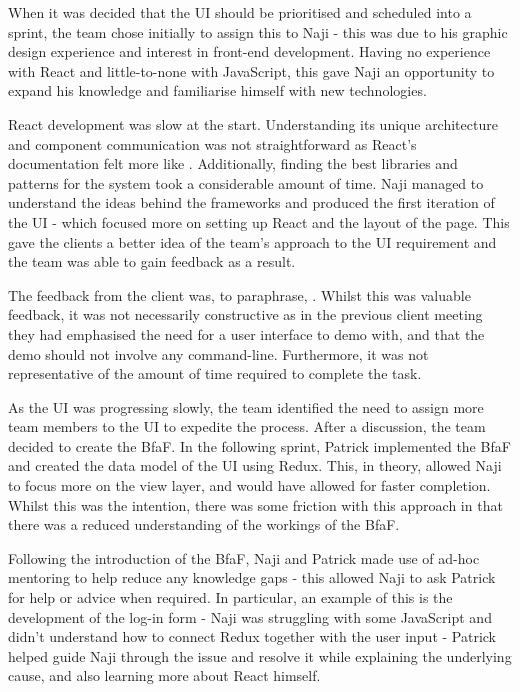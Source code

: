 \documentclass{l3proj}
\begin{document}
When it was decided that the UI should be prioritised and scheduled into a sprint, the team chose initially to assign this to Naji - this was due to his graphic design experience and interest in front-end development. Having no experience with React and little-to-none with JavaScript, this gave Naji an opportunity to expand his knowledge and familiarise himself with new technologies.

React development was slow at the start. Understanding its unique architecture and component communication was not straightforward as React's documentation felt more like . Additionally, finding the best libraries and patterns for the system took a considerable amount of time. Naji managed to understand the ideas behind the frameworks and produced the first iteration of the UI - which focused more on setting up React and the layout of the page. This gave the clients a better idea of the team's approach to the UI requirement and the team was able to gain feedback as a result.

The feedback from the client was, to paraphrase, . Whilst this was valuable feedback, it was not necessarily constructive as in the previous client meeting they had emphasised the need for a user interface to demo with, and that the demo should not involve any command-line. Furthermore, it was not representative of the amount of time required to complete the task.

As the UI was progressing slowly, the team identified the need to assign more team members to the UI to expedite the process. After a discussion, the team decided to create the BfaF. In the following sprint, Patrick implemented the BfaF and created the data model of the UI using Redux. This, in theory, allowed Naji to focus more on the view layer, and would have allowed for faster completion. Whilst this was the intention, there was some friction with this approach in that there was a reduced understanding of the workings of the BfaF.

Following the introduction of the BfaF, Naji and Patrick made use of ad-hoc mentoring to help reduce any knowledge gaps - this allowed Naji to ask Patrick for help or advice when required. In particular, an example of this is the development of the log-in form - Naji was struggling with some JavaScript and didn't understand how to connect Redux together with the user input - Patrick helped guide Naji through the issue and resolve it while explaining the underlying cause, and also learning more about React himself.
\end{document}
